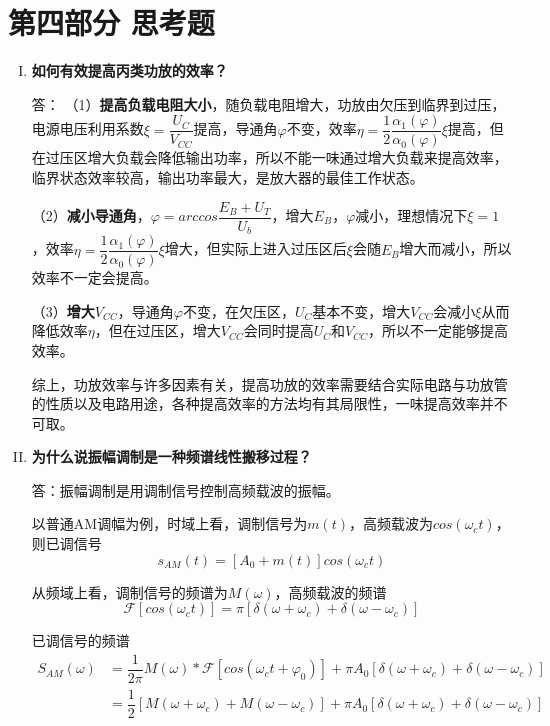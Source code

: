 \documentclass[UTF8]{ctexart}
\begin{document}
\section{第四部分 \texorpdfstring{\quad}{} 思考题}
\begin{enumerate}[I.]

    \item \textbf{如何有效提高丙类功放的效率？}
    
    答：
    （1）\textbf{提高负载电阻大小}，随负载电阻增大，功放由欠压到临界到过压，电源电压利用系数$\xi=\dfrac{U_C}{V_{CC}}$提高，导通角$\varphi$不变，效率$\eta=\dfrac{1}{2}\dfrac{\alpha_1(\varphi)}{\alpha_0(\varphi)}\xi$提高，但在过压区增大负载会降低输出功率，所以不能一味通过增大负载来提高效率，临界状态效率较高，输出功率最大，是放大器的最佳工作状态。
    
    （2）\textbf{减小导通角}，$\varphi=arccos\dfrac{E_B+U_T}{U_b}$，增大$E_B$，$\varphi$减小，理想情况下$\xi=1$，效率$\eta=\dfrac{1}{2}\dfrac{\alpha_1(\varphi)}{\alpha_0(\varphi)}\xi$增大，但实际上进入过压区后$\xi$会随$E_B$增大而减小，所以效率不一定会提高。

    （3）\textbf{增大$V_{CC}$}，导通角$\varphi$不变，在欠压区，$U_C$基本不变，增大$V_{CC}$会减小$\xi$从而降低效率$\eta$，但在过压区，增大$V_{CC}$会同时提高$U_C$和$V_{CC}$，所以不一定能够提高效率。

    综上，功放效率与许多因素有关，提高功放的效率需要结合实际电路与功放管的性质以及电路用途，各种提高效率的方法均有其局限性，一味提高效率并不可取。
    \item \textbf{为什么说振幅调制是一种频谱线性搬移过程？}
    
    答：振幅调制是用调制信号控制高频载波的振幅。

    以普通AM调幅为例，时域上看，调制信号为$m(t)$，高频载波为$cos(\omega_ct)$，则已调信号
    $$s_{AM}(t)=[A_0+m(t)]cos(\omega_ct)$$

    从频域上看，调制信号的频谱为$M(\omega)$，高频载波的频谱
    $$\mathcal{F}[cos(\omega_ct)]=\pi[\delta(\omega+\omega_c)+\delta(\omega-\omega_c)]$$
    
    已调信号的频谱
    \begin{align*}
        S_{AM}(\omega)&=\dfrac{1}{2\pi}  M(\omega)*\mathcal{F}[cos(\omega_ct+\varphi_0)] +\pi A_0[\delta(\omega+\omega_c)+\delta(\omega-\omega_c)]\\
        &=\dfrac{1}{2}[M(\omega+\omega_c)+M(\omega-\omega_c)]+\pi A_0[\delta(\omega+\omega_c)+\delta(\omega-\omega_c)]
    \end{align*}
    

\end{enumerate}
\end{document}
